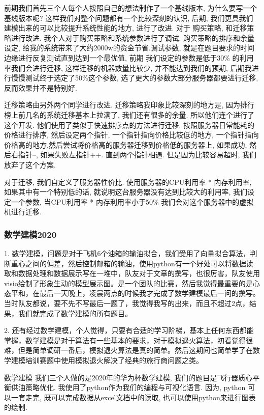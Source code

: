 前期我们首先三个人每个人按照自己的想法制作了一个基线版本, 为什么要写一个基线版本呢? 这样我们对整个问题都有一个比较深刻的认识, 后期, 我们更具我们建模出来的可以比较提升系统性能的地方, 进行了改进.
对于 购买策略, 和迁移策略进行改进. 我个人对于购买策略和系统参数进行了调试. 购买策略的排序和余量设定, 给我的系统带来了大约2000w的资金节省.调试参数, 就是在题目要求的时间边缘进行反复测试直到达到一个最优值, 前期 我们设定的参数是低于30\% 的利用率我们会进行迁移, 这样迁移的机器数量比较少, 并不能达到我们的预期, 后期我进行慢慢测试终于选定了50\%这个参数, 选了更大的参数大部分服务器都要进行迁移, 反而效果并不是特别好. \par
迁移策略由另外两个同学进行改进. 迁移策略我印象比较深刻的地方是, 因为排行榜上前几名的系统迁移基本上拉满了, 我们还有很多的余量. 所以他们连个进行了这个开发.
他们使用了类似于快速排序点的方法进行迁移. 按照服务器日常能耗的价格进行排序, 然后设定两个指针, 一个指针指向价格比较低的地方, 一个指针指向价格高的地方,然后尝试将价格高的服务器迁移到价格低的服务器上, 如果成功, 然后右指针--, 如果失败左指针++. 直到两个指针相遇. 但是因为比较容易超时, 我们放弃了这个方案. \par
对于迁移, 我们自定义了服务器性价比. 使用服务器的CPU利用率 * 内存利用率, 如果其中有一个特别低的话, 就说明这台服务器没有达到比较大的利用率, 我们设定一个参数, 当CPU利用率 *  内存利用率小于50\% 我们会对这个服务器中的虚拟机进行迁移. \par
\subsubsection{数学建模2020}
1. 数学建模，问题是对于飞机6个油箱的输油拟合，我们受用了向量拟合算法，判断重心之间的偏差，然后控制邮箱的输油，使用python有一个好处可以将数据读取和数据处理和数据展示写在一堆中，队友对于文章的撰写，也很厉害，队友使用visio绘制了形象生动的模型展示图。是一个团队的比赛，然后我觉得最重要的是心态平和，在最后一天晚上，凌晨两点的时候我才完成了数学建模最后一问的撰写。当时队友都说，要不先不写最后一题了，我觉得我写的出来，而且不超过2点，结果，我们就完成了数学建模的所有题目。\par
2. 还有经过数学建模，个人觉得，只要有合适的学习阶梯，基本上任何东西都能掌握，数学建模是对于算法有一些基本的要求，对于模拟退火算法，初看觉得很难，但是简单调研一番后，模拟退火算法是真的简单。然后这期间也简单学了在数学建模培训赛题中使用模拟退火解决了经典的旅行商问题之类。\par

数学建模
我们三个人做的是2020年的华为杯数学建模, 我们的题目是飞行器质心平衡供油策略优化. 我使用了python作为我们的编程与可视化语言. 因为, python 可以一套走完, 既可以完成数据从excel文档中的读取, 也可以使用python来进行图表的绘制. \par


